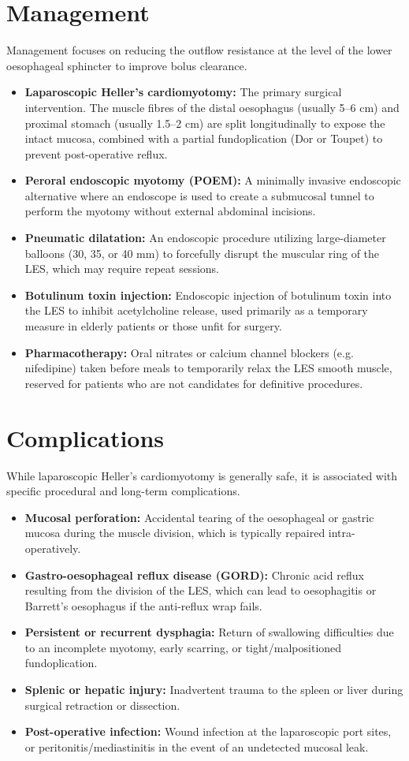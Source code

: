 \section*{Management}
Management focuses on reducing the outflow resistance at the level of the lower oesophageal sphincter to improve bolus clearance.
\begin{itemize}
    \item \textbf{Laparoscopic Heller's cardiomyotomy:} The primary surgical intervention. The muscle fibres of the distal oesophagus (usually 5--6 cm) and proximal stomach (usually 1.5--2 cm) are split longitudinally to expose the intact mucosa, combined with a partial fundoplication (Dor or Toupet) to prevent post-operative reflux.
    \item \textbf{Peroral endoscopic myotomy (POEM):} A minimally invasive endoscopic alternative where an endoscope is used to create a submucosal tunnel to perform the myotomy without external abdominal incisions.
    \item \textbf{Pneumatic dilatation:} An endoscopic procedure utilizing large-diameter balloons (30, 35, or 40 mm) to forcefully disrupt the muscular ring of the LES, which may require repeat sessions.
    \item \textbf{Botulinum toxin injection:} Endoscopic injection of botulinum toxin into the LES to inhibit acetylcholine release, used primarily as a temporary measure in elderly patients or those unfit for surgery.
    \item \textbf{Pharmacotherapy:} Oral nitrates or calcium channel blockers (e.g. nifedipine) taken before meals to temporarily relax the LES smooth muscle, reserved for patients who are not candidates for definitive procedures.
\end{itemize}

\section*{Complications}
While laparoscopic Heller's cardiomyotomy is generally safe, it is associated with specific procedural and long-term complications.
\begin{itemize}
    \item \textbf{Mucosal perforation:} Accidental tearing of the oesophageal or gastric mucosa during the muscle division, which is typically repaired intra-operatively.
    \item \textbf{Gastro-oesophageal reflux disease (GORD):} Chronic acid reflux resulting from the division of the LES, which can lead to oesophagitis or Barrett's oesophagus if the anti-reflux wrap fails.
    \item \textbf{Persistent or recurrent dysphagia:} Return of swallowing difficulties due to an incomplete myotomy, early scarring, or tight/malpositioned fundoplication.
    \item \textbf{Splenic or hepatic injury:} Inadvertent trauma to the spleen or liver during surgical retraction or dissection.
    \item \textbf{Post-operative infection:} Wound infection at the laparoscopic port sites, or peritonitis/mediastinitis in the event of an undetected mucosal leak.
\end{itemize}

